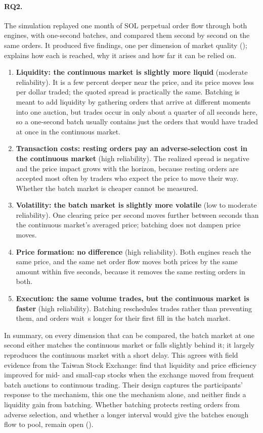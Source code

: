 \paragraph{RQ2.} The simulation replayed one month of SOL perpetual order
flow through both engines, with one-second batches, and compared them
second by second on the same orders. It produced five findings, one per
dimension of market quality ();
 explains how each is reached, why it arises
and how far it can be relied on.
\begin{enumerate}[label=\textbf{F\arabic*}]
  \item \textbf{Liquidity: the continuous market is slightly more liquid}
  (moderate reliability). It is a few percent deeper near the price, and
  its price moves less per dollar traded; the quoted spread is practically
  the same. Batching is meant to add liquidity by gathering orders that
  arrive at different moments into one auction, but trades occur in only
  about a quarter of all seconds here, so a one-second batch usually
  contains just the orders that would have traded at once in the
  continuous market.
  \item \textbf{Transaction costs: resting orders pay an adverse-selection
  cost in the continuous market} (high reliability). The realized spread is
  negative and the price impact grows with the horizon, because resting
  orders are accepted most often by traders who expect the price to move
  their way. Whether the batch market is cheaper cannot be measured.
  \item \textbf{Volatility: the batch market is slightly more volatile}
  (low to moderate reliability). One clearing price per second moves
  further between seconds than the continuous market's averaged price;
  batching does not dampen price moves.
  \item \textbf{Price formation: no difference} (high reliability). Both
  engines reach the same price, and the same net order flow moves both
  prices by the same amount within five seconds, because it removes the
  same resting orders in both.
  \item \textbf{Execution: the same volume trades, but the continuous
  market is faster} (high reliability). Batching reschedules trades
  rather than preventing them, and orders wait \ResTimeToExecDiff\,s longer
  for their first fill in the batch market.
\end{enumerate}

In summary, on every dimension that can be compared, the batch market at
one second either matches the continuous market or falls slightly behind
it; it largely reproduces the continuous market with a short delay. This
agrees with field evidence from the Taiwan Stock Exchange:
\citet{lee2026taiwan} find that liquidity and price efficiency improved
for mid- and small-cap stocks when the exchange moved from frequent batch
auctions to continuous trading. Their design captures the participants'
response to the mechanism, this one the mechanism alone, and neither finds
a liquidity gain from batching. Whether batching protects resting orders
from adverse selection, and whether a longer interval would give the
batches enough flow to pool, remain open ().

